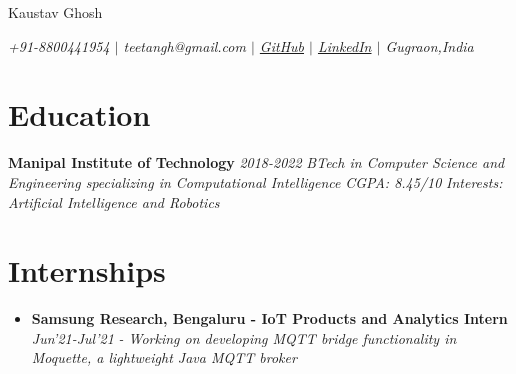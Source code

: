 \documentclass{article}
\makeatletter
\renewcommand{\maketitle}{
    \begin{flushleft}        
        {\huge\rmfamily
        \theauthor}\newline
        \vspace{0.1em}
        \textit{teetangh@gmail.com -- github.com/teetangh}\newline
        \textit{Contact No. -- +91-8800441954}\newline
        \textit{Manipal Institute of Technology}\newline
        \textit{B.Tech in \textbf{Computer Science \& Engineering}}
        \textit{2018 - 2022}\newline
        \textit{Minor in \textbf{Computational Intelligence}}\newline
        \textit{CGPA: 8.45/10}\newline
    \end{flushleft}

}
\makeatother
\begin{document}
\thispagestyle{empty}  %


\begin{center}
    \huge{Kaustav Ghosh}

    \normalsize{
        \textit{
            +91-8800441954 \(|\)
            teetangh@gmail.com \(|\)
            \href{https://www.github.com/teetangh}{GitHub} \(|\)
            \href{https://www.linkedin.com/in/kaustav-ghosh-1538651bb/}{LinkedIn} \(|\)
            Gugraon,India
        }}
\end{center}

\section*{Education}

\textbf{Manipal Institute of Technology} \hfill \textit{2018-2022}
\textmd{\newline \textit{BTech in Computer Science and Engineering specializing in Computational Intelligence}} \hfill \textit{CGPA: 8.45/10}
\textmd{\newline \textit{Interests: Artificial Intelligence and Robotics}}

\section*{Internships}

\begin{itemize}
    \item{\textbf{\large{Samsung Research, Bengaluru - IoT Products and Analytics Intern}}} \hfill \textit{Jun'21-Jul'21}
          \newline
          \textit{- Working on developing MQTT bridge functionality in Moquette, a lightweight Java MQTT broker}
\end{itemize}
\end{document}
